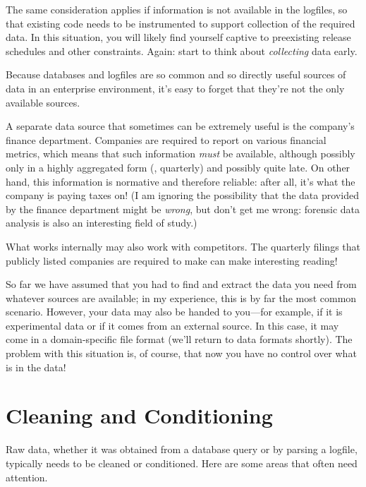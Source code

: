 The same consideration applies if information is not available in the
logfiles, so that existing code needs to be instrumented to support
collection of the required data. In this situation, you will likely
find yourself captive to preexisting release schedules and other
constraints. Again: start to think about \emph{collecting} data early.

Because databases and logfiles are so common and so directly useful
sources of data in an enterprise environment, it's easy to forget that
they're not the only available sources.

A separate data source that sometimes can be extremely useful is the
company's finance department. Companies are required to report on
various financial metrics, which means that such information
\emph{must} be available, although possibly only in a highly
aggregated form (\eg, quarterly) and possibly quite late.  On other
hand, this\vadjust{\pagebreak} information is normative and therefore reliable: after all,
it's what the company is paying taxes on! (I am ignoring the
possibility that the data provided by the finance department might be
\emph{wrong}, but don't get me wrong: forensic data analysis is also
an interesting field of study.)

What works internally may also work with competitors. The quarterly
filings that publicly listed companies are required to make can make
interesting reading!

So far we have assumed that you had to find and extract the data you
need from whatever sources are available; in my experience, this is by
far the most common scenario. However, your data may also be handed to
you---for example, if it is experimental data or if it comes from an
external source. In this case, it may come in a domain-specific file
format (we'll return to data formats shortly).  The problem with this
situation is, of course, that now you have no control over what is in
the data!\vspace*{-9pt}

\section{Cleaning and Conditioning}


Raw data, whether it was obtained from a database query or by parsing
a logfile, typically needs to be cleaned or conditioned. Here are some 
areas that often need attention.

